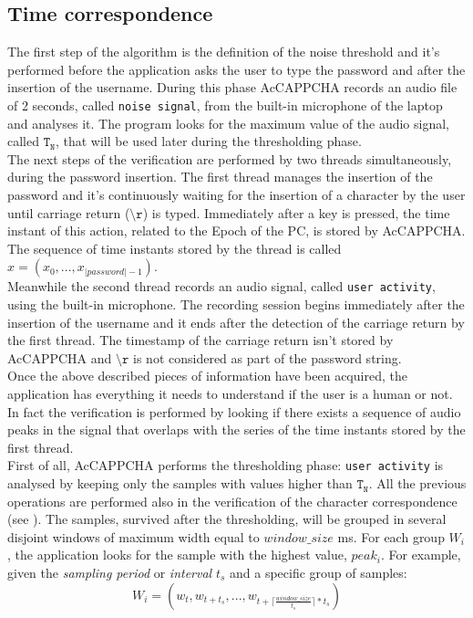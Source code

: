 \subsection{Time correspondence}\label{AcCAPPCHA:time_correspondence}
The first step of the algorithm is the definition of the noise threshold and it's performed before the application asks the user to type the password and after the insertion of the username. During this phase AcCAPPCHA records an audio file of 2 seconds, called \texttt{noise signal}, from the built-in microphone of the laptop and analyses it. The program looks for the maximum value of the audio signal, called $\mathtt{T_N}$, that will be used later during the thresholding phase.\\
The next steps of the verification are performed by two threads simultaneously, during the password insertion. The first thread manages the insertion of the password and it's continuously waiting for the insertion of a character by the user until carriage return ($\mathtt{\setminus r}$) is typed. Immediately after a key is pressed, the time instant of this action, related to the Epoch of the PC, is stored by AcCAPPCHA. The sequence of time instants stored by the thread is called $x=(x_0, ..., x_{|password|-1})$.\\
Meanwhile the second thread records an audio signal, called \texttt{user activity}, using the built-in microphone. The recording session begins immediately after the insertion of the username and it ends after the detection of the carriage return by the first thread. The timestamp of the carriage return isn't stored by AcCAPPCHA and $\mathtt{\setminus r}$ is not considered as part of the password string.\\
Once the above described pieces of information have been acquired, the application has everything it needs to understand if the user is a human or not. In fact the verification is performed by looking if there exists a sequence of audio peaks in the signal that overlaps with the series of the time instants stored by the first thread.\\
First of all, AcCAPPCHA performs the thresholding phase: \texttt{user activity} is analysed by keeping only the samples with values higher than $\mathtt{T_N}$. All the previous operations are performed also in the verification of the character correspondence (see ). The samples, survived after the thresholding, will be grouped in several disjoint windows of maximum width equal to $window\_size$ ms. For each group $W_i$, the application looks for the sample with the highest value, $peak_i$. For example, given the \textit{sampling period} or  \textit{interval} $t_s$ and a specific group of samples: $$W_i = (w_t, w_{t+t_s}, ..., w_{t+\lceil \frac{window\_size}{t_s}\rceil * t_s})$$
